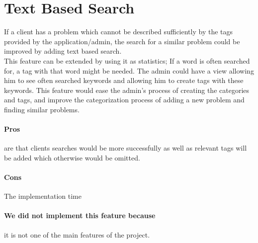 \section{Text Based Search}
\label{sec:text_based_search}
If a client has a problem which cannot be described sufficiently by the tags provided by the application/admin, the search for a similar problem could be improved by adding text based search. \\
This feature can be extended by using it as statistics; If a word is often searched for, a tag with that word might be needed. 
The admin could have a view allowing him to see often searched keywords and allowing him to create tags with these keywords.
This feature would ease the admin's process of creating the categories and tags, and improve the categorization process of adding a new problem and finding similar problems.

\paragraph{Pros} are that clients searches would be more successfully as well as relevant tags will be added which otherwise would be omitted.
\paragraph{Cons} The implementation time
\paragraph{We did not implement this feature because} it is not one of the main features of the project. 